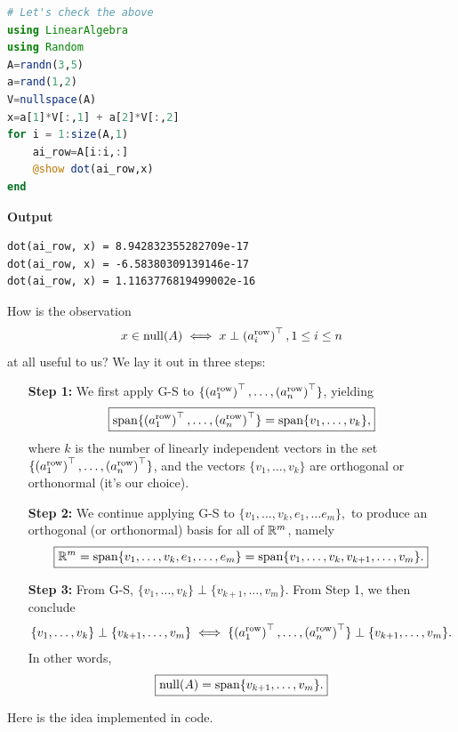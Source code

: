 \begin{lstlisting}[language=Julia,style=mystyle]
# Let's check the above
using LinearAlgebra
using Random
A=randn(3,5)
a=rand(1,2)
V=nullspace(A)
x=a[1]*V[:,1] + a[2]*V[:,2]
for i = 1:size(A,1)
    ai_row=A[i:i,:]
    @show dot(ai_row,x)
end
\end{lstlisting}
\textbf{Output} 
\begin{verbatim}
dot(ai_row, x) = 8.942832355282709e-17
dot(ai_row, x) = -6.58380309139146e-17
dot(ai_row, x) = 1.1163776819499002e-16
\end{verbatim}

How is the observation 
$$x \in \mathrm{null}(A) \iff x \perp \left(a^{\rm row}_i \right)^\top, 1 \le i \le n$$ at all useful to us? We lay it out in three steps:

\begin{enumerate}
    \item[\textbf{Step 1:}] We first apply G-S to $\{\left(a^{\rm row}_1 \right)^\top, \ldots,  \left(a^{\rm row}_n \right)^\top \}$, yielding
$$\boxed{\mathrm{span} \{ \left(a^{\rm row}_1 \right)^\top, \ldots,  \left(a^{\rm row}_n \right)^\top  \} = \mathrm{span} \{ v_1, \ldots,v_k \},}$$
where $k$ is the number of linearly independent vectors in the set $\{\left(a^{\rm row}_1 \right)^\top, \ldots,  \left(a^{\rm row}_n \right)^\top \}$, and the vectors  $\{ v_1, \ldots,v_k \}$ are orthogonal or orthonormal (it's our choice). 

\item[\textbf{Step 2:}] We continue applying G-S to 
$ \{ v_1, \ldots,v_k, e_1, \ldots e_m   \},$
to produce an orthogonal (or orthonormal) basis for all of $\mathbb R^m$, namely
$$\boxed{\mathbb R^m = \mathrm{span} \{ v_1, \ldots,  v_k, e_1, \ldots, e_m  \} = \mathrm{span} \{ v_1, \ldots,v_k, v_{k+1}, \ldots, v_m \}.}$$

\item[\textbf{Step 3:}] From G-S, $\{v_1, \ldots,  v_k\} \perp \{ v_{k+1}, \ldots, v_m\}$. From Step 1, we then conclude
$$\{v_1, \ldots,  v_k\} \perp \{ v_{k+1}, \ldots, v_m\}  \iff  \{\left(a^{\rm row}_1 \right)^\top, \ldots,  \left(a^{\rm row}_n \right)^\top \} \perp \{ v_{k+1}, \ldots, v_m\}.$$
In other words, 
$$\boxed{\mathrm{null}(A) = \mathrm{span} \{ v_{k+1}, \ldots, v_m \}.} $$
\end{enumerate}


Here is the idea implemented in code.


